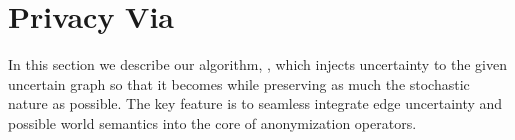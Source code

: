 \section{Privacy Via {\methodName}}
In this section we describe our algorithm, {\methodName}, which injects uncertainty to the given uncertain graph so that it becomes {\keobf} while preserving as much the stochastic nature as possible. The key feature is to seamless integrate edge uncertainty and possible world semantics into the core of anonymization operators. 
% 
\subsection{}


